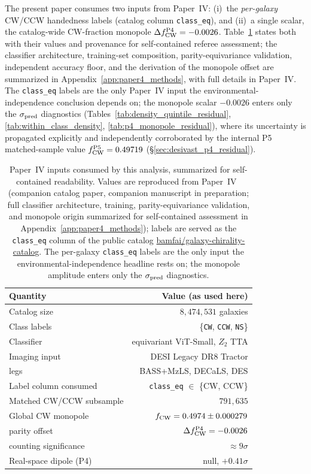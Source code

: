 \documentclass[aps,prd,twocolumn,superscriptaddress,showpacs,preprintnumbers,nofootinbib,longbibliography,floatfix]{revtex4-2}
\newcommand{\paperIVarxiv}{companion manuscript in preparation}
\begin{document}
The present paper consumes two inputs from Paper~IV:
(i)~the \emph{per-galaxy} CW/CCW handedness labels (catalog column
\texttt{class\_eq}), and (ii)~a single scalar, the catalog-wide CW-fraction
monopole $\Delta f_{\rm CW}^{\rm P4} = -0.0026$. Table~\ref{tab:p4_inputs}
states both with their values and provenance for self-contained referee
assessment; the classifier architecture, training-set composition,
parity-equivariance validation, independent accuracy floor, and the
derivation of the monopole offset are summarized in
Appendix~\ref{app:paper4_methods}, with full details in Paper~IV. The
\texttt{class\_eq} labels are the only Paper~IV input the
environmental-independence conclusion depends on; the monopole scalar
$-0.0026$ enters only the $\sigma_{\rm pred}$ diagnostics
(Tables~\ref{tab:density_quintile_residual},
\ref{tab:within_class_density}, \ref{tab:p4_monopole_residual}), where
its uncertainty is propagated explicitly and independently corroborated by
the internal P5 matched-sample value $f_{\rm CW}^{\rm P5} = 0.49719$
(\S\ref{sec:desivast_p4_residual}).

\begin{table}[t]
\caption{Paper~IV inputs consumed by this analysis, summarized for
self-contained readability. Values are reproduced from
Paper~IV~\cite{golden_chirality_2026} (companion catalog paper, \paperIVarxiv;
full classifier architecture, training, parity-equivariance validation, and monopole
origin summarized for self-contained assessment in
Appendix~\ref{app:paper4_methods});
labels are served as the \texttt{class\_eq} column of the public catalog
\href{https://huggingface.co/datasets/bamfai/galaxy-chirality-catalog}{bamfai/galaxy-chirality-catalog}.
The per-galaxy \texttt{class\_eq} labels are the only input the
environmental-independence headline rests on; the monopole amplitude enters
only the $\sigma_{\rm pred}$ diagnostics.}
\label{tab:p4_inputs}
\begin{ruledtabular}
\footnotesize
\begin{tabular}{lr}
Quantity & Value (as used here) \\
\hline
Catalog size & $8{,}474{,}531$ galaxies \\
Class labels & \{\texttt{CW}, \texttt{CCW}, \texttt{NS}\} \\
Classifier & equivariant ViT-Small, $Z_2$ TTA \\
Imaging input & DESI Legacy DR8 Tractor \\
\quad legs & BASS+MzLS, DECaLS, DES \\
Label column consumed & \texttt{class\_eq} $\in$ \{CW, CCW\} \\
Matched CW/CCW subsample & $791{,}635$ \\
Global CW monopole & $f_{\rm CW} = 0.4974 \pm 0.000279$ \\
\quad parity offset & $\Delta f_{\rm CW}^{\rm P4}=-0.0026$ \\
\quad counting significance & ${\approx}9\sigma$ \\
Real-space dipole (P4) & null, $+0.41\sigma$ \\
\end{tabular}
\end{ruledtabular}
\end{table}
\end{document}

